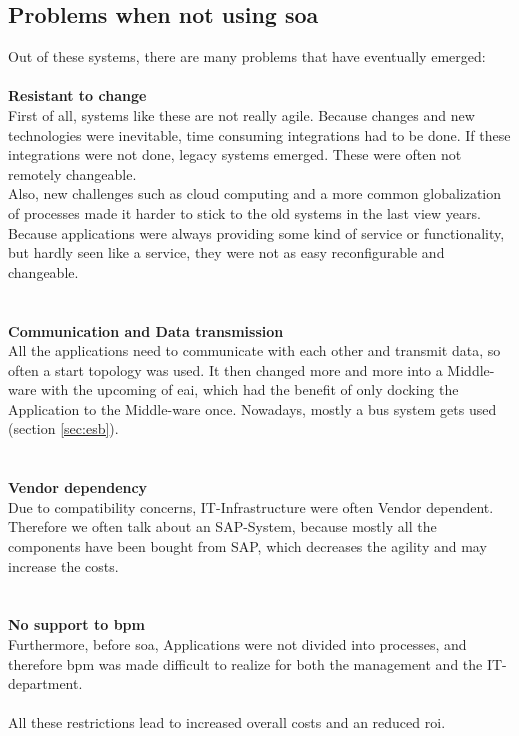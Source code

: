 \documentclass[12pt]{article}
\begin{document}
\subsection{Problems when not using \gls{soa}}
Out of these systems, there are many problems that have eventually emerged:
\\ \\\textbf{Resistant to change}\\
First of all, systems like these are not really agile. Because changes and new technologies were inevitable, time consuming integrations had to be done. If these integrations were not done, legacy systems emerged. These were often not remotely changeable. \\
Also, new challenges such as cloud computing and a more common globalization of processes made it harder to stick to the old systems in the last view years. \\
Because applications were always providing some kind of service or functionality, but hardly seen like a service, they were not as easy reconfigurable and changeable. \\
\\ \\\textbf{Communication and Data transmission}\\
All the applications need to communicate with each other and transmit data, so often a start topology was used. It then changed more and more into a Middle-ware with the upcoming of \gls{eai}, which had the benefit of only docking the Application to the Middle-ware once. Nowadays, mostly a bus system gets used (section \ref{sec:esb}). \\
\\ \\\textbf{Vendor dependency}\\
Due to compatibility concerns, IT-Infrastructure were often Vendor dependent. Therefore we often talk about an SAP-System, because mostly all the components have been bought from SAP, which decreases the agility and may increase the costs.\\
\\ \\\textbf{No support to \gls{bpm}}\\
Furthermore, before \gls{soa}, Applications were not divided into processes, and therefore \gls{bpm} was made difficult to realize for both the management and the IT-department. \\ \\
All these restrictions lead to increased overall costs and an reduced \gls{roi}.
\end{document}
